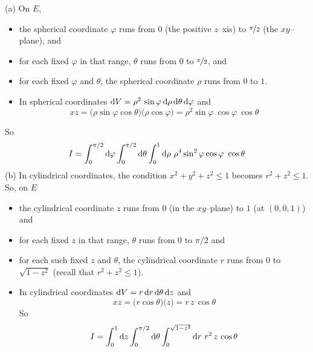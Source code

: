 \begin{solution}
(a)
On $E$,
\begin{itemize}
\item
the spherical coordinate $\varphi$ runs from $0$ (the positive $z$--xis)
to $\nicefrac{\pi}{2}$ (the $xy$--plane), and
\item 
for each fixed $\varphi$ in that range,
$\theta$ runs from $0$ to $\nicefrac{\pi}{2}$, and
\item
for each fixed $\varphi$ and $\theta$, the spherical coordinate
$\rho$ runs from $0$ to $1$.
\item
In spherical coordinates 
  $\mathrm{d}V=\rho^2\,\sin\varphi\,\mathrm{d}\rho\,\mathrm{d}\theta\, \mathrm{d}\varphi$
and
\begin{equation*}
   xz=\big(\rho\sin\varphi\cos\theta\big)\big(\rho\cos\varphi\big)
      =\rho^2 \sin\varphi\ \cos\varphi\ \cos\theta
\end{equation*}
\end{itemize}
So
\begin{align*}
I=\int_0^{\pi/2}\dee{\varphi}\int_0^{\pi/2}\dee{\theta}\int_0^1\dee{\rho}\ 
         \rho^4\sin^2\varphi\cos\varphi\ \cos\theta
\end{align*} 
(b)
In cylindrical coordinates, the condition $x^2+y^2+z^2\le 1$
becomes $r^2+z^2\le 1$. So, on $E$
\begin{itemize}
\item
the cylindrical coordinate $z$ runs from $0$ (in the $xy$--plane)
to $1$ (at $(0,0,1)$) and
\item
for each fixed $z$ in that range, $\theta$ runs from $0$ to $\pi/2$ and
\item
for each such fixed $z$ and $\theta$, the cylindrical coordinate
$r$ runs from $0$ to $\sqrt{1-z^2}$ (recall that $r^2+z^2\le 1$).
\item
In cylindrical coordinates 
  $\mathrm{d}V=r\,\mathrm{d}r\,\mathrm{d}\theta\, \mathrm{d}z$
and
\begin{equation*}
   xz=\big(r\cos\theta\big)\big(z\big)
      =r\,z\, \cos\theta
\end{equation*}
So
\begin{align*}
I=\int_0^1\dee{z}\int_0^{\pi/2}\dee{\theta}\int_0^{\sqrt{1-z^2}}\dee{r} \ 
         r^2\,z\,\cos\theta
\end{align*}  


\end{itemize}
\end{solution}
